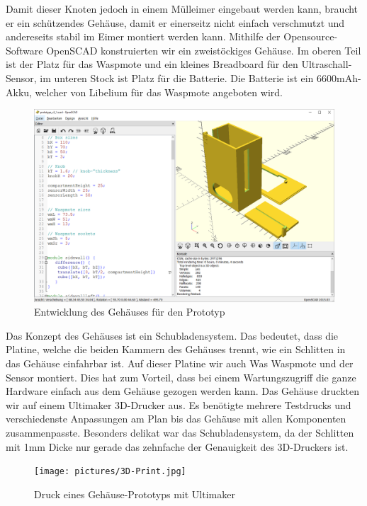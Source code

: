 Damit dieser Knoten jedoch in einem Mülleimer eingebaut werden kann, braucht er ein schützendes Gehäuse, damit er einerseitz nicht einfach verschmutzt und andereseits stabil im Eimer montiert werden kann. Mithilfe der Opensource-Software OpenSCAD konstruierten wir ein zweistöckiges Gehäuse. Im oberen Teil ist der Platz für das Waspmote und ein kleines Breadboard für den Ultraschall-Sensor, im unteren Stock ist Platz für die Batterie. Die Batterie ist ein 6600mAh-Akku, welcher von Libelium für das Waspmote angeboten wird. 
 
\begin{figure}[H]
     \centering
        \includegraphics[width=1.0\textwidth]{pictures/OpenSCAD.png}
    \caption{Entwicklung des Gehäuses für den Prototyp}
    \label{fig:OpenSCAD}
\end{figure}

Das Konzept des Gehäuses ist ein Schubladensystem. Das bedeutet, dass die Platine, welche die beiden Kammern des Gehäuses trennt, wie ein Schlitten in das Gehäuse einfahrbar ist. Auf dieser Platine wir auch Was Waspmote und der Sensor montiert. Dies hat zum Vorteil, dass bei einem Wartungszugriff die ganze Hardware einfach aus dem Gehäuse gezogen werden kann.
Das Gehäuse druckten wir auf einem Ultimaker 3D-Drucker aus. Es benötigte mehrere Testdrucks und verschiedenste Anpassungen am Plan bis das Gehäuse mit allen Komponenten zusammenpasste. Besonders delikat war das Schubladensystem, da der Schlitten mit 1mm Dicke nur gerade das zehnfache der Genauigkeit des 3D-Druckers ist.

\begin{figure}[H]
     \centering
        \texttt{[image: pictures/3D-Print.jpg]}
    \caption{Druck eines Gehäuse-Prototyps mit Ultimaker}
    \label{fig:3D-Print}
\end{figure}

